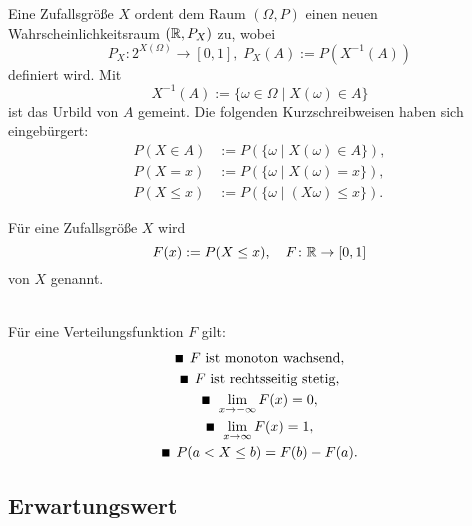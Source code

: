 \noindent
Eine Zufallsgröße $X$ ordent dem Raum $(\Omega,P)$
einen neuen Wahrscheinlichkeitsraum $(\mathbb R,P_X)$ zu, wobei%
\begin{equation}
P_X\colon 2^{X(\Omega)}\to [0,1],\; P_X(A):=P(X^{-1}(A))
\end{equation}
definiert wird. Mit
\begin{equation}
X^{-1}(A) := \{\omega\in\Omega\mid X(\omega)\in A\}
\end{equation}
ist das Urbild von $A$ gemeint.
Die folgenden Kurzschreibweisen haben sich
eingebürgert:
\begin{align}
P(X\in A) &:= P(\{\omega\mid X(\omega)\in A\}),\\
P(X=x) &:= P(\{\omega\mid X(\omega)=x\}),\\
P(X\le x) &:= P(\{\omega\mid (X\omega)\le x\}).
\end{align}

\begin{definition}[Verteilungsfunktion]\mbox{}\newline
Für eine Zufallsgröße $X$ wird
\begin{equation}
F(x):=P(X\le x),\quad F\colon\mathbb R\to [0,1]
\end{equation}
 von $X$ genannt.
\end{definition}

\noindent
{}\\
Für eine Verteilungsfunktion $F$ gilt:
\begin{gather}
\text{\scriptsize $\blacksquare$}\;\, F\text{ ist monoton wachsend},\\
\text{\scriptsize $\blacksquare$}\;\, F\text{ ist rechtsseitig stetig},\\
\text{\scriptsize $\blacksquare$}\;\, \lim\limits_{x\to -\infty} F(x) = 0,\\
\text{\scriptsize $\blacksquare$}\;\, \lim\limits_{x\to\infty} F(x)=1,\\
\text{\scriptsize $\blacksquare$}\;\, P(a<X\le b) = F(b)-F(a).
\end{gather}

\newpage
\subsection{Erwartungswert}

